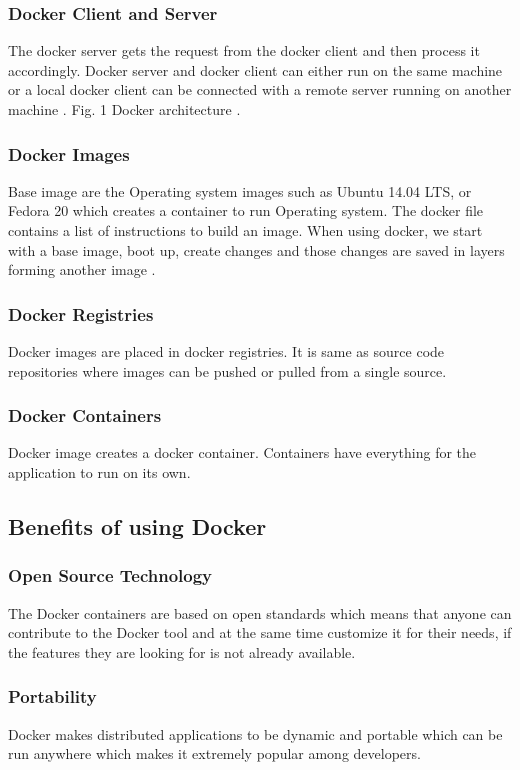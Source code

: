 \documentclass[sigconf]{acmart}
\begin{document}
	\subsubsection{Docker Client and Server}
	The docker server gets the request from the docker client and then process it accordingly. Docker server and docker client can either run on the same machine or a local docker client can be connected with a remote server running on another machine \cite{turnbull2014docker}.
	Fig. 1 Docker architecture \cite{turnbull2014docker}.
	\subsubsection{Docker Images}
	Base image are the Operating system images such as Ubuntu 14.04 LTS, or Fedora 20 which creates a container to run Operating system. The docker file contains a list of instructions to build an image. When using docker, we start with a base image, boot up, create changes and those changes are saved in layers forming another image \cite{rad2017introduction}.
	\subsubsection{Docker Registries}
	Docker images are placed in docker registries. It is same as source code repositories where images can be pushed or pulled from a single source.
	\subsubsection{Docker Containers}
	Docker image creates a docker container. Containers have everything for the application to run on its own.
	
	\subsection{Benefits of using Docker}
	\subsubsection{Open Source Technology}
	The Docker containers are based on open standards which means that anyone can contribute to the Docker tool and at the same time customize it for their needs, if the features they are looking for is not already available.
	\subsubsection{Portability}
	Docker makes distributed applications to be dynamic and portable which can be run anywhere which makes it extremely popular among developers.
\end{document}
